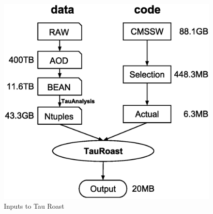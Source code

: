 \documentclass{acm_proc_article-sp}
\begin{document}
\begin{figure}[t]
\centering
\includegraphics[width=.8\columnwidth]{data-code-size.eps}
\caption{Inputs to Tau Roast}
\label{fig:data-code-size}
\end{figure}
\end{document}
